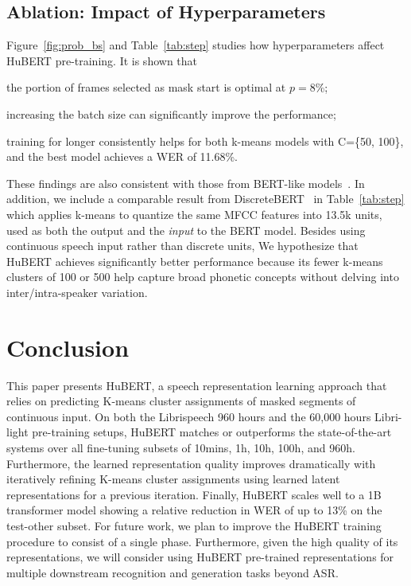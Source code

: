 \subsection{Ablation: Impact of Hyperparameters}
Figure~\ref{fig:prob_bs} and Table~\ref{tab:step} studies how hyperparameters affect HuBERT pre-training. It is shown that

\begin{enumerate*}[label=(\arabic*)]
    \item the portion of frames selected as mask start is optimal at $p=$8\%;
    \item increasing the batch size can significantly improve the performance; 
    \item training for longer consistently helps for both k-means models with C=\{50, 100\}, and the best model achieves a WER of 11.68\%.
\end{enumerate*}

These findings are also consistent with those from BERT-like models~\cite{clark2020electra}. In addition, we include a comparable result from DiscreteBERT~\cite{baevski2019effectiveness} in Table~\ref{tab:step} which applies k-means to quantize the same MFCC features into 13.5k units, used as both the output and the \textit{input} to the BERT model. Besides using continuous speech input rather than discrete units, We hypothesize that HuBERT achieves significantly better performance because its fewer k-means clusters of 100 or 500 help capture broad phonetic concepts without delving into inter/intra-speaker variation. 

\section{Conclusion}
This paper presents HuBERT, a speech representation learning approach that relies on predicting K-means cluster assignments of masked segments of continuous input. On both the Librispeech 960 hours and the 60,000 hours Libri-light pre-training setups, HuBERT matches or outperforms the state-of-the-art systems over all fine-tuning subsets of 10mins, 1h, 10h, 100h, and 960h. Furthermore, the learned representation quality improves dramatically with iteratively refining K-means cluster assignments using learned latent representations for a previous iteration. Finally, HuBERT scales well to a 1B transformer model showing a relative reduction in WER of up to 13\% on the test-other subset. For future work, we plan to improve the HuBERT training procedure to consist of a single phase. Furthermore, given the high quality of its representations, we will consider using HuBERT pre-trained representations for multiple downstream recognition and generation tasks beyond ASR.

\ifCLASSOPTIONcaptionsoff

\fi


